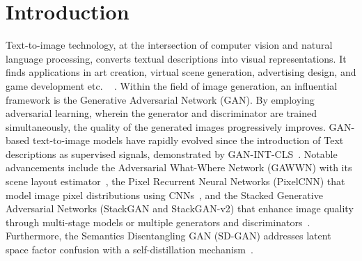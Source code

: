 \documentclass[runningheads, orivec]{llncs}
\begin{document}
\vspace{-20pt}
\section{Introduction}

Text-to-image technology, at the intersection of computer vision and natural language processing, converts textual descriptions into visual representations. It finds applications in art creation, virtual scene generation, advertising design, and game development etc. ~\cite{isola2017image} \cite{gatys2015neural} \cite{karras2017progressive} \cite{frolov2021adversarial} \cite{hald2020procedural}. 
Within the field of image generation, an influential framework is the Generative Adversarial Network (GAN). By employing adversarial learning, wherein the generator and discriminator are trained simultaneously, the quality of the generated images progressively improves.
GAN-based text-to-image models have rapidly evolved since the introduction of Text descriptions as supervised signals, demonstrated by GAN-INT-CLS~\cite{reed2016generative}. Notable advancements include the Adversarial What-Where Network (GAWWN) with its scene layout estimator~\cite{reed2016learning},  the Pixel Recurrent Neural Networks (PixelCNN) that model image pixel distributions using CNNs~\cite{van2016conditional}, and the Stacked Generative Adversarial Networks (StackGAN and StackGAN-v2) that enhance image quality through multi-stage models or multiple generators and discriminators~\cite{zhang2017stackgan}\cite{zhang2018stackgan++}. Furthermore, the Semantics Disentangling GAN (SD-GAN) addresses latent space factor confusion with a self-distillation mechanism~\cite{yin2019semantics}.
\end{document}
